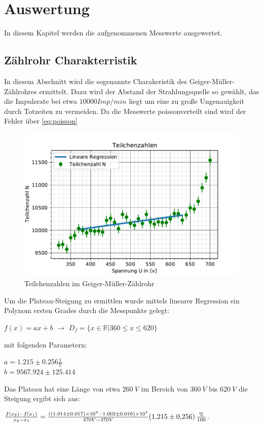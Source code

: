 \section{Auswertung}
\label{sec:auswertung}
In diesem Kapitel werden die aufgenommenen Messwerte ausgewertet.
\subsection{Zählrohr Charakterristik}
\label{sec:characteristik}
In diesem Abschnitt wird die sogenannte Charakeristik des Geiger-Müller-Zählrohres ermittelt. Dazu wird der
Abstand der Strahlungsquelle so gewählt, das die Impulsrate bei etwa $10000 Imp/min$ liegt um eine zu große 
Ungenauigkeit durch Totzeiten zu vermeiden. Da die Messwerte poissonverteilt sind wird der Fehler über \autoref{eq:poisson}
\begin{figure}
    \centering
    \includegraphics{kennlinie.pdf}
    \caption{Teilchenzahlen im Geiger-Müller-Zählrohr}
    \label{fig:teilchenzahl}
  \end{figure}
Um die Plateau-Steigung zu ermittlen wurde mittels linearer Regression ein Polynom ersten Grades durch die Messpunkte gelegt:
\begin{center}
  $f(x)=ax+b$ $\rightarrow$ $D_f=\{x\in\mathbb{R} \vert 360\le x\le620\}$    
\end{center}
mit folgenden Parametern:
\begin{center}
  $a=1.215\pm0.256 \frac{1}{V} $\\
  $b=9567.924\pm125.414 $
\end{center}
Das Plateau hat eine Länge von etwa $\SI{260}{V}$ im Bereich von $\SI{360}{V}$ bis $\SI{620}{V}$ die Steigung 
ergibt sich aus:
\begin{center}
 $\frac{f(x_2)-f(x_1)}{x_2-x_1}=\frac{((1.014\pm0.017)\times 10^4-1.002\pm0.016)\times 10^4}{470 V-370 V}\SI{1,215\pm0,256}{\frac{\%}{100}}$.
\end{center}
